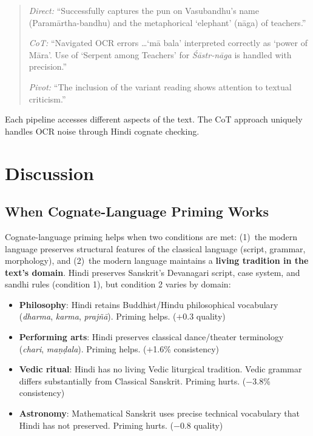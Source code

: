 \documentclass[10pt,twocolumn]{article}
\begin{document}
\begin{quote}
\small
\emph{Direct:} ``Successfully captures the pun on Vasubandhu's name (Param\=artha-bandhu) and the metaphorical `elephant' (n\=aga) of teachers.''

\emph{CoT:} ``Navigated OCR errors \ldots `m\=a bala' interpreted correctly as `power of M\=ara'. Use of `Serpent among Teachers' for \emph{\'S\=astr-n\=aga} is handled with precision.''

\emph{Pivot:} ``The inclusion of the variant reading shows attention to textual criticism.''
\end{quote}

Each pipeline accesses different aspects of the text. The CoT approach uniquely handles OCR noise through Hindi cognate checking.

\section{Discussion}

\subsection{When Cognate-Language Priming Works}

Cognate-language priming helps when two conditions are met: (1)~the modern language preserves structural features of the classical language (script, grammar, morphology), and (2)~the modern language maintains a \textbf{living tradition in the text's domain}. Hindi preserves Sanskrit's Devanagari script, case system, and sandhi rules (condition 1), but condition 2 varies by domain:

\begin{itemize}
\item \textbf{Philosophy}: Hindi retains Buddhist/Hindu philosophical vocabulary (\emph{dharma}, \emph{karma}, \emph{praj\~n\=a}). Priming helps. ($+$0.3 quality)
\item \textbf{Performing arts}: Hindi preserves classical dance/theater terminology (\emph{chari}, \emph{ma\d{n}\d{d}ala}). Priming helps. ($+$1.6\% consistency)
\item \textbf{Vedic ritual}: Hindi has no living Vedic liturgical tradition. Vedic grammar differs substantially from Classical Sanskrit. Priming hurts. ($-$3.8\% consistency)
\item \textbf{Astronomy}: Mathematical Sanskrit uses precise technical vocabulary that Hindi has not preserved. Priming hurts. ($-$0.8 quality)
\end{itemize}
\end{document}
